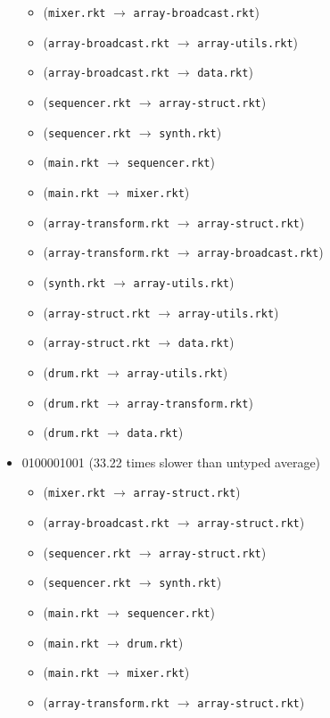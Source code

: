 \documentclass{article}
\newcommand{\mono}[1]{\texttt{#1}}
\begin{document}
\begin{itemize}
\begin{itemize}
  \item (\mono{mixer.rkt} $\rightarrow$ \mono{array-broadcast.rkt})
  \item (\mono{array-broadcast.rkt} $\rightarrow$ \mono{array-utils.rkt})
  \item (\mono{array-broadcast.rkt} $\rightarrow$ \mono{data.rkt})
  \item (\mono{sequencer.rkt} $\rightarrow$ \mono{array-struct.rkt})
  \item (\mono{sequencer.rkt} $\rightarrow$ \mono{synth.rkt})
  \item (\mono{main.rkt} $\rightarrow$ \mono{sequencer.rkt})
  \item (\mono{main.rkt} $\rightarrow$ \mono{mixer.rkt})
  \item (\mono{array-transform.rkt} $\rightarrow$ \mono{array-struct.rkt})
  \item (\mono{array-transform.rkt} $\rightarrow$ \mono{array-broadcast.rkt})
  \item (\mono{synth.rkt} $\rightarrow$ \mono{array-utils.rkt})
  \item (\mono{array-struct.rkt} $\rightarrow$ \mono{array-utils.rkt})
  \item (\mono{array-struct.rkt} $\rightarrow$ \mono{data.rkt})
  \item (\mono{drum.rkt} $\rightarrow$ \mono{array-utils.rkt})
  \item (\mono{drum.rkt} $\rightarrow$ \mono{array-transform.rkt})
  \item (\mono{drum.rkt} $\rightarrow$ \mono{data.rkt})
  \end{itemize}
\item 0100001001 (33.22 times slower than untyped average)
  \begin{itemize}
  \item (\mono{mixer.rkt} $\rightarrow$ \mono{array-struct.rkt})
  \item (\mono{array-broadcast.rkt} $\rightarrow$ \mono{array-struct.rkt})
  \item (\mono{sequencer.rkt} $\rightarrow$ \mono{array-struct.rkt})
  \item (\mono{sequencer.rkt} $\rightarrow$ \mono{synth.rkt})
  \item (\mono{main.rkt} $\rightarrow$ \mono{sequencer.rkt})
  \item (\mono{main.rkt} $\rightarrow$ \mono{drum.rkt})
  \item (\mono{main.rkt} $\rightarrow$ \mono{mixer.rkt})
  \item (\mono{array-transform.rkt} $\rightarrow$ \mono{array-struct.rkt})

\end{itemize}
\end{itemize}
\end{document}
